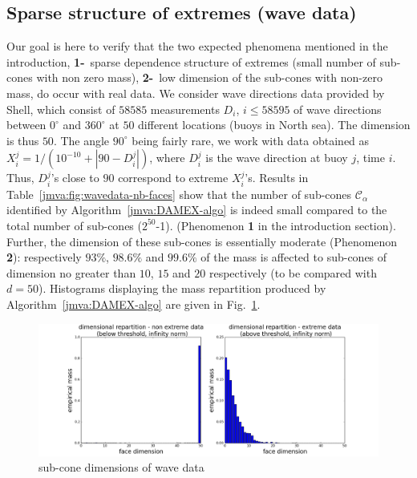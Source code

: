 \subsection{Sparse structure of extremes  (wave data)}
Our goal is here to verify that the two expected phenomena mentioned
in the introduction, \textbf{1-}~sparse dependence structure of extremes (small number
of sub-cones with non zero mass), \textbf{2-}~low dimension of the
sub-cones with non-zero mass,  do occur with real data. 
We consider wave
directions data provided by Shell, which consist of $58585$
measurements  $D_i$, $i\le 58595$ of wave directions between $0^{\circ}$ and $360^{\circ}$ at $50$ different
locations (buoys in North sea). The dimension is thus $50$. %
The angle $90^{\circ}$ being fairly
rare, we work with data obtained as $X_i^j = 1/(10^{-10} + |90-
D_i^j|)$, where $D_i^j$ is the wave direction at buoy $j$, time $i$. Thus,
$D_i^j$'s close to $90$ correspond to  extreme $X_i^j$'s.
Results in
Table~\ref{jmva:fig:wavedata-nb-faces} %
show that 
the %
number of  sub-cones $\mathcal{C}_\alpha$ identified by Algorithm~\ref{jmva:DAMEX-algo}
is indeed small compared to the total number of sub-cones ($2^{50}$-1).
(Phenomenon \textbf{1} in the introduction section). 
Further, the dimension of these sub-cones is essentially moderate
(Phenomenon \textbf{2}):
respectively $93\%$, $98.6\%$ and  $99.6\%$
of the mass is affected to  sub-cones of dimension no greater  than $10$,
$15$ and $20$ respectively %
(to be compared with $d=50$).  Histograms displaying the mass repartition produced by Algorithm~\ref{jmva:DAMEX-algo} are given in Fig.~\ref{jmva:fig:wavedata-dim}.
\begin{figure}[!ht]
\centering
\includegraphics[scale=0.33]{fig_source/wave_dir2}
\caption{sub-cone dimensions of wave data}
\label{jmva:fig:wavedata-dim}
\end{figure}

